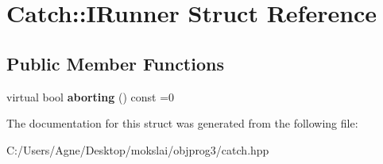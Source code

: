 \hypertarget{struct_catch_1_1_i_runner}{}\section{Catch\+:\+:I\+Runner Struct Reference}
\label{struct_catch_1_1_i_runner}
\subsection*{Public Member Functions}
\begin{DoxyCompactItemize}
\item 
\mbox{\label{struct_catch_1_1_i_runner_a03713202dd2e041e30b8030088ab0116}} 
virtual bool {\bfseries aborting} () const =0
\end{DoxyCompactItemize}


The documentation for this struct was generated from the following file\+:\begin{DoxyCompactItemize}
\item 
C\+:/\+Users/\+Agne/\+Desktop/mokslai/objprog3/catch.\+hpp\end{DoxyCompactItemize}
